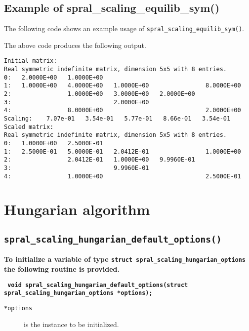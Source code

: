 \subsection{Example of spral\_scaling\_equilib\_sym()}
The following code shows an example usage of \texttt{spral\_scaling\_equilib\_sym()}.

The above code produces the following output.
\begin{verbatim}
Initial matrix:
Real symmetric indefinite matrix, dimension 5x5 with 8 entries.
0:   2.0000E+00   1.0000E+00                                       
1:   1.0000E+00   4.0000E+00   1.0000E+00                8.0000E+00
2:                1.0000E+00   3.0000E+00   2.0000E+00             
3:                             2.0000E+00                          
4:                8.0000E+00                             2.0000E+00
Scaling:    7.07e-01   3.54e-01   5.77e-01   8.66e-01   3.54e-01
Scaled matrix:
Real symmetric indefinite matrix, dimension 5x5 with 8 entries.
0:   1.0000E+00   2.5000E-01                                       
1:   2.5000E-01   5.0000E-01   2.0412E-01                1.0000E+00
2:                2.0412E-01   1.0000E+00   9.9960E-01             
3:                             9.9960E-01                          
4:                1.0000E+00                             2.5000E-01
\end{verbatim}


\section{Hungarian algorithm}

\subsection{\texttt{spral\_scaling\_hungarian\_default\_options()}}

\textbf{To initialize a variable of type
   \texttt{struct spral\_scaling\_hungarian\_options} the following routine
   is provided.}

\vspace*{0.3cm}
\noindent
\textbf{\texttt{
   \hspace*{0.3cm} void spral\_scaling\_hungarian\_default\_options(struct spral\_scaling\_hungarian\_options *options);
}}
\vspace*{-0.4cm}

\begin{description}
   \item[\texttt{*options}] is the instance to be initialized.
\end{description}

